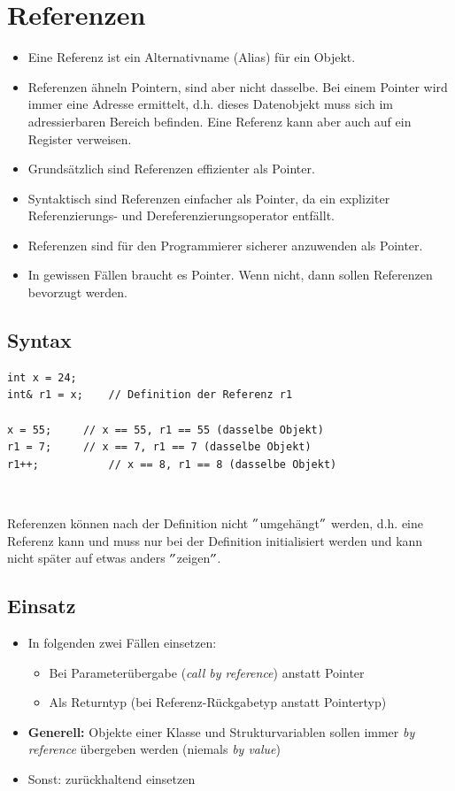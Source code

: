 \section{Referenzen}
\begin{itemize}
	\item Eine Referenz ist ein Alternativname (Alias) für ein Objekt.
	\item Referenzen ähneln Pointern, sind aber nicht dasselbe. Bei einem Pointer wird immer eine Adresse ermittelt, d.h. dieses Datenobjekt muss sich im adressierbaren Bereich befinden. Eine Referenz kann aber auch auf ein Register verweisen.
	\item Grundsätzlich sind Referenzen effizienter als Pointer.
	\item Syntaktisch sind Referenzen einfacher als Pointer, da ein expliziter Referenzierungs- und Dereferenzierungsoperator entfällt.
	\item Referenzen sind für den Programmierer sicherer anzuwenden als Pointer.
	\item In gewissen Fällen braucht es Pointer. Wenn nicht, dann sollen Referenzen bevorzugt werden.
\end{itemize}

\subsection{Syntax}
\vspace{-\baselineskip}
\begin{minipage}{0.65\linewidth}
\begin{lstlisting}
int x = 24;
int& r1 = x;	// Definition der Referenz r1

x = 55;		// x == 55, r1 == 55 (dasselbe Objekt)
r1 = 7;		// x == 7, r1 == 7 (dasselbe Objekt)
r1++;			// x == 8, r1 == 8 (dasselbe Objekt)
\end{lstlisting}
\end{minipage}\\
\begin{hinweis}
Referenzen können nach der Definition nicht $"$umgehängt$"$ werden, d.h. eine Referenz kann und muss nur bei der Definition initialisiert werden und kann nicht später auf etwas anders $"$zeigen$"$.
\end{hinweis}

\subsection{Einsatz}
\begin{itemize}
	\item In folgenden zwei Fällen einsetzen:
	\begin{itemize}
		\item Bei Parameterübergabe (\emph{call by reference}) anstatt Pointer
		\item Als Returntyp (bei Referenz-Rückgabetyp anstatt Pointertyp)
	\end{itemize}
	\item \textbf{Generell:} Objekte einer Klasse und Strukturvariablen sollen immer \emph{by reference} übergeben werden (niemals \emph{by value})
	\item Sonst: zurückhaltend einsetzen
\end{itemize}

